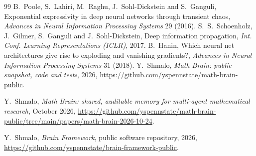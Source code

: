 \documentclass[11pt,a4paper]{article}
\theoremstyle{definition}
\theoremstyle{remark}
\begin{document}
\begin{thebibliography}{99}
 B.~Poole, S.~Lahiri, M.~Raghu, J.~Sohl-Dickstein and S.~Ganguli, Exponential expressivity in deep neural networks through transient chaos, \emph{Advances in Neural Information Processing Systems} 29 (2016).
 S.~S.~Schoenholz, J.~Gilmer, S.~Ganguli and J.~Sohl-Dickstein, Deep information propagation, \emph{Int. Conf. Learning Representations (ICLR)}, 2017.
 B.~Hanin, Which neural net architectures give rise to exploding and vanishing gradients?, \emph{Advances in Neural Information Processing Systems} 31 (2018).
 Y.~Shmalo, \emph{Math Brain: public snapshot, code and tests}, 2026, \url{https://github.com/yspennstate/math-brain-public}.

 Y.~Shmalo, \emph{Math Brain: shared, auditable memory for multi-agent mathematical research}, October 2026, \url{https://github.com/yspennstate/math-brain-public/tree/main/papers/math-brain-2026-10-24}.

 Y.~Shmalo, \emph{Brain Framework}, public software repository, 2026, \url{https://github.com/yspennstate/brain-framework-public}.

\end{thebibliography}
\end{document}

